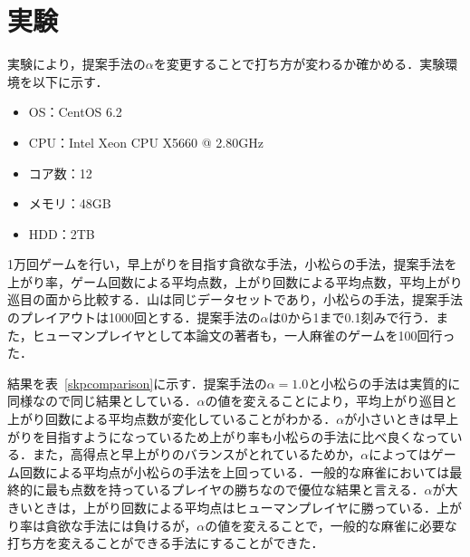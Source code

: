 \section{実験}
実験により，提案手法の$\alpha$を変更することで打ち方が変わるか確かめる．実験環境を以下に示す．
\begin{itemize}
\item OS：CentOS 6.2
\item CPU：Intel Xeon CPU X5660 @ 2.80GHz
\item コア数：12
\item メモリ：48GB
\item HDD：2TB
\end{itemize}

1万回ゲームを行い，早上がりを目指す貪欲な手法，小松らの手法，提案手法を上がり率，ゲーム回数による平均点数，上がり回数による平均点数，平均上がり巡目の面から比較する．山は同じデータセットであり，小松らの手法，提案手法のプレイアウトは1000回とする．提案手法の$\alpha$は0から1まで0.1刻みで行う．また，ヒューマンプレイヤとして本論文の著者も，一人麻雀のゲームを100回行った．

結果を表~\ref{skpcomparison}に示す．提案手法の$\alpha=1.0$と小松らの手法は実質的に同様なので同じ結果としている．$\alpha$の値を変えることにより，平均上がり巡目と上がり回数による平均点数が変化していることがわかる．$\alpha$が小さいときは早上がりを目指すようになっているため上がり率も小松らの手法に比べ良くなっている．また，高得点と早上がりのバランスがとれているためか，$\alpha$によってはゲーム回数による平均点が小松らの手法を上回っている．一般的な麻雀においては最終的に最も点数を持っているプレイヤの勝ちなので優位な結果と言える．$\alpha$が大きいときは，上がり回数による平均点はヒューマンプレイヤに勝っている．上がり率は貪欲な手法には負けるが，$\alpha$の値を変えることで，一般的な麻雀に必要な打ち方を変えることができる手法にすることができた．


